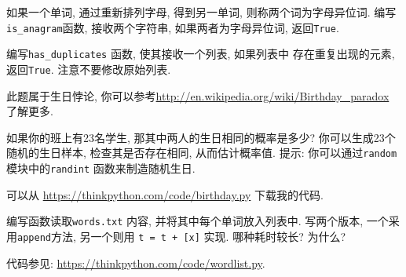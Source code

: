 \documentclass[10pt]{book}
\begin{document}
\begin{exercise}
\label{anagram}

如果一个单词, 通过重新排列字母, 得到另一单词, 则称两个词为字母异位词. 
编写\verb"is_anagram"函数, 接收两个字符串, 如果两者为字母异位词, 返回{\tt True}.
\end{exercise}



\begin{exercise}
\label{duplicate}

编写\verb"has_duplicates" 函数, 使其接收一个列表, 如果列表中
存在重复出现的元素, 返回{\tt True}. 注意不要修改原始列表.

\end{exercise}


\begin{exercise}

此题属于生日悖论, 你可以参考\url{http://en.wikipedia.org/wiki/Birthday_paradox}
了解更多.

如果你的班上有23名学生, 那其中两人的生日相同的概率是多少? 
你可以生成23个随机的生日样本, 检查其是否存在相同, 从而估计概率值. 
提示: 你可以通过{\tt random}模块中的{\tt randint} 函数来制造随机生日. 

可以从 \url{https://thinkpython.com/code/birthday.py} 下载我的代码.

\end{exercise}


\begin{exercise}

编写函数读取{\tt words.txt} 内容, 并将其中每个单词放入列表中. 
写两个版本, 一个采用{\tt append}方法, 另一个则用 {\tt t = t + [x]} 实现. 
哪种耗时较长? 为什么?

代码参见: \url{https://thinkpython.com/code/wordlist.py}.

\end{exercise}
\end{document}
